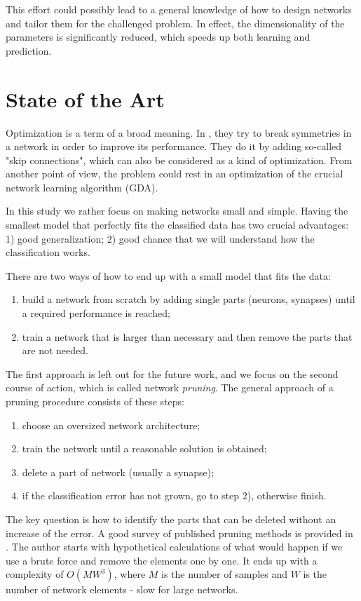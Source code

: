 This effort could possibly lead to a general knowledge of how to design networks and tailor them for the challenged problem. In effect, the dimensionality of the parameters is significantly reduced, which speeds up both learning and prediction.

\section{State of the Art} \label{sec:state_of_the_art}
Optimization is a term of a broad meaning. In \citep{orhan:symmetry}, they try to break symmetries in a network in order to improve its performance. They do it by adding so-called "skip connections", which can also be considered as a kind of optimization. From another point of view, the problem could rest in an optimization of the crucial network learning algorithm (GDA).

In this study we rather focus on making networks small and simple. Having the smallest model that perfectly fits the classified data has two crucial advantages: 1) good generalization; 2) good chance that we will understand how the classification works.

There are two ways of how to end up with a small model that fits the data:

\begin{enumerate}
\item build a network from scratch by adding single parts (neurons, synapses) until a required performance is reached;
\item train a network that is larger than necessary and then remove the parts that are not needed.
\end{enumerate}

The first approach is left out for the future work, and we focus on the second course of action, which is called network \textit{pruning}. The general approach of a pruning procedure consists of these steps:

\begin{enumerate}
\item choose an oversized network architecture;
\item train the network until a reasonable solution is obtained;
\item delete a part of network (usually a synapse);
\item if the classification error has not grown, go to step 2), otherwise finish.
\end{enumerate}

The key question is how to identify the parts that can be deleted without an increase of the error. A good survey of published pruning methods is provided in \citep{reed:pa_survey}. The author starts with hypothetical calculations of what would happen if we use a brute force and remove the elements one by one. It ends up with a complexity of $ O(MW^3) $, where $ M $ is the number of samples and $ W $ is the number of network elements - slow for large networks. 

